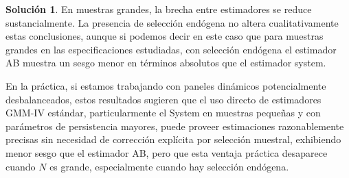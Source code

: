 \documentclass[12pt,letterpaper,reqno,oneside]{amsart}
\theoremstyle{problemstyle} %
\theoremstyle{definition} %
\newtheorem{solution}{Solución}[problem]
\begin{document}
\begin{solution}
  En muestras grandes, la brecha entre estimadores se reduce sustancialmente.
  La presencia de selección endógena no altera cualitativamente estas conclusiones, aunque si podemos decir en este caso que para muestras grandes en las especificaciones estudiadas, con selección endógena el estimador AB muestra un sesgo menor en términos absolutos que el estimador system.

  En la práctica, si estamos trabajando con paneles dinámicos potencialmente desbalanceados, estos resultados sugieren que el uso directo de estimadores GMM-IV estándar, particularmente el System en muestras pequeñas y con parámetros de persistencia mayores, puede proveer estimaciones razonablemente precisas sin necesidad de corrección explícita por selección muestral, exhibiendo menor sesgo que el estimador AB, pero que esta ventaja práctica desaparece cuando $N$ es grande, especialmente cuando hay selección endógena.

\end{solution}
\endgroup
\printbibliography
\end{document}
